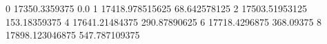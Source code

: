 0 17350.3359375 0.0
1 17418.978515625 68.642578125
2 17503.51953125 153.18359375
4 17641.21484375 290.87890625
6 17718.4296875 368.09375
8 17898.123046875 547.787109375
